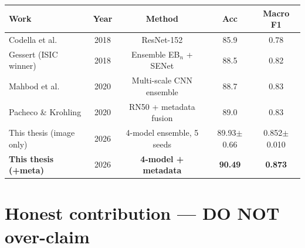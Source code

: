 \documentclass[11pt,a4paper]{article}
\begin{document}
\begin{table}[h]
\centering\small
\begin{tabular}{lcccc}
\toprule
\textbf{Work} & \textbf{Year} & \textbf{Method} & \textbf{Acc} & \textbf{Macro F1} \\
\midrule
Codella et al.        & 2018 & ResNet-152                & 85.9 & 0.78 \\
Gessert (ISIC winner) & 2018 & Ensemble EB$_n$ + SENet   & 88.5 & 0.82 \\
Mahbod et al.         & 2020 & Multi-scale CNN ensemble  & 88.7 & 0.83 \\
Pacheco \& Krohling   & 2020 & RN50 + metadata fusion    & 89.0 & 0.83 \\
This thesis (image only) & 2026 & 4-model ensemble, 5 seeds & 89.93$\pm$0.66 & 0.852$\pm$0.010 \\
\rowcolor{usthblue!10}
\textbf{This thesis (+meta)} & 2026 & \textbf{4-model + metadata} & \textbf{90.49} & \textbf{0.873} \\
\bottomrule
\end{tabular}
\end{table}

\section{Honest contribution --- DO NOT over-claim}
\end{document}
